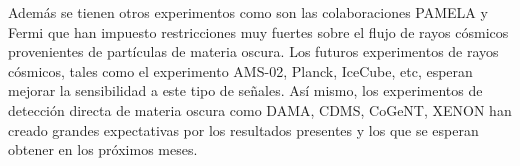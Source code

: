 \begin{ideas}
 Además se tienen otros experimentos como son las colaboraciones PAMELA y Fermi que han impuesto restricciones muy fuertes sobre el flujo de rayos cósmicos provenientes de partículas de materia oscura. Los futuros experimentos de rayos cósmicos, tales como el experimento AMS-02, Planck, IceCube, etc, esperan mejorar la sensibilidad a este tipo de señales. Así mismo, los experimentos de detección directa de materia oscura como DAMA, CDMS, CoGeNT, XENON han creado grandes expectativas por los resultados presentes y los que se esperan obtener en los próximos meses.




\end{ideas}
